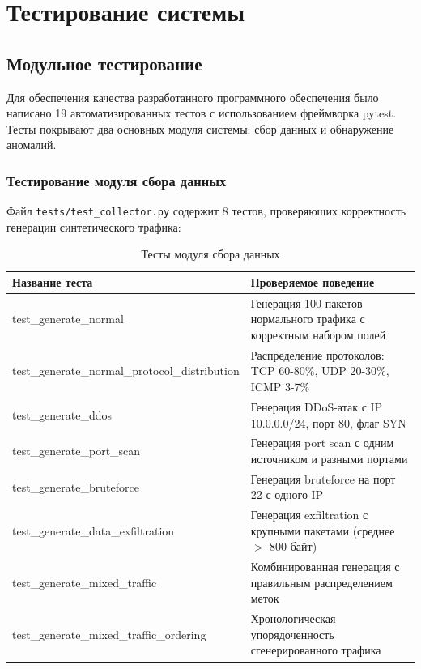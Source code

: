 \chapter{Тестирование системы}

\section{Модульное тестирование}

Для обеспечения качества разработанного программного обеспечения было написано 19 автоматизированных тестов с использованием фреймворка pytest. Тесты покрывают два основных модуля системы: сбор данных и обнаружение аномалий.

\subsection{Тестирование модуля сбора данных}

Файл \texttt{tests/test\_collector.py} содержит 8 тестов, проверяющих корректность генерации синтетического трафика:

\begin{table}[H]
\centering
\caption{Тесты модуля сбора данных}
\label{tab:tests_collector}
\begin{tabular}{p{5cm}p{9.5cm}}
\toprule
\textbf{Название теста} & \textbf{Проверяемое поведение} \\
\midrule
test\_generate\_normal & Генерация 100 пакетов нормального трафика с корректным набором полей \\
test\_generate\_normal\_protocol\_distribution & Распределение протоколов: TCP 60-80\%, UDP 20-30\%, ICMP 3-7\% \\
test\_generate\_ddos & Генерация DDoS-атак с IP 10.0.0.0/24, порт 80, флаг SYN \\
test\_generate\_port\_scan & Генерация port scan с одним источником и разными портами \\
test\_generate\_bruteforce & Генерация bruteforce на порт 22 с одного IP \\
test\_generate\_data\_exfiltration & Генерация exfiltration с крупными пакетами (среднее $>$ 800 байт) \\
test\_generate\_mixed\_traffic & Комбинированная генерация с правильным распределением меток \\
test\_generate\_mixed\_traffic\_ordering & Хронологическая упорядоченность сгенерированного трафика \\
\bottomrule
\end{tabular}
\end{table}


